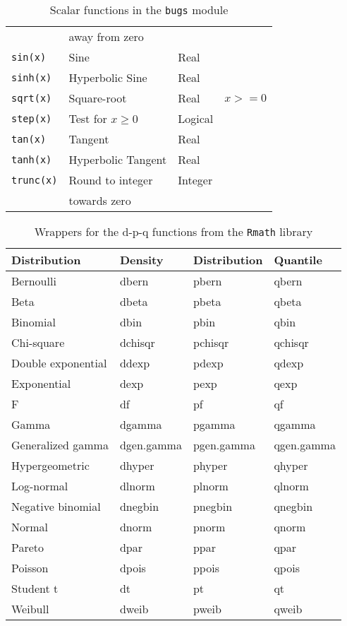 \documentclass[11pt, a4paper, titlepage]{report}
\begin{document}
\begin{table}
\begin{center}
\begin{tabular}{llll}
                    & away from zero      &      & \\
\verb+sin(x)+       & Sine                & Real & \\
\verb+sinh(x)+      & Hyperbolic Sine     & Real & \\
\verb+sqrt(x)+      & Square-root         & Real & $x >= 0$ \\
\verb+step(x)+      & Test for $x \geq 0$ & Logical & \\
\verb+tan(x)+       & Tangent             & Real & \\
\verb+tanh(x)+      & Hyperbolic Tangent  & Real & \\
\verb+trunc(x)+     & Round to integer    & Integer & \\
                    & towards zero        & \\
\hline
\end{tabular}
\caption{Scalar functions in the \texttt{bugs} module \label{table:bugs:scalar}}
\end{center}
\end{table}

\begin{table}
\begin{center}
\begin{tabular}{llll}
\hline
Distribution & Density & Distribution & Quantile \\
\hline
Bernoulli          & dbern     & pbern     & qbern \\
Beta               & dbeta     & pbeta     & qbeta \\
Binomial           & dbin      & pbin      & qbin \\
Chi-square         & dchisqr   & pchisqr   & qchisqr \\
Double exponential & ddexp     & pdexp     & qdexp \\
Exponential        & dexp      & pexp      & qexp \\
F                  & df        & pf        & qf \\
Gamma              & dgamma    & pgamma    & qgamma \\
Generalized gamma  & dgen.gamma & pgen.gamma & qgen.gamma \\
Hypergeometric     & dhyper    & phyper    & qhyper \\
Log-normal         & dlnorm    & plnorm    & qlnorm \\
Negative binomial  & dnegbin   & pnegbin   & qnegbin \\
Normal             & dnorm     & pnorm     & qnorm \\
Pareto             & dpar      & ppar      & qpar \\
Poisson            & dpois     & ppois     & qpois \\
Student t          & dt        & pt        & qt \\
Weibull            & dweib     & pweib     & qweib \\
\hline
\end{tabular}
\caption{Wrappers for the d-p-q functions from the \texttt{Rmath} library
  \label{table:bugs:dpq}}
\end{center}
\end{table}
\end{document}
